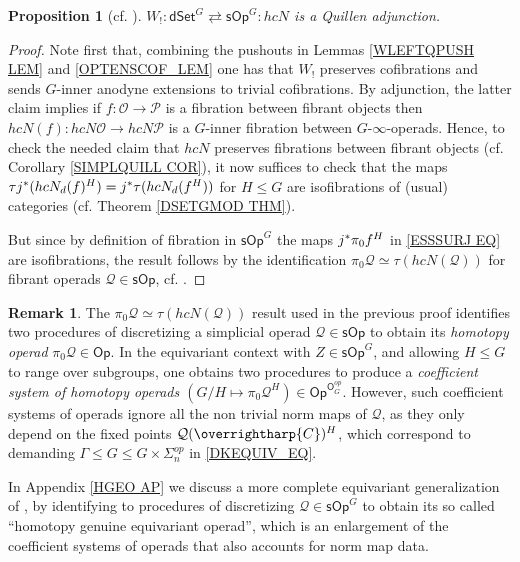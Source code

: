 \documentclass[a4paper,10pt
,draft
]{article}%
\numberwithin{equation}{section}
\numberwithin{figure}{section}
\newtheorem{proposition}[equation]{Proposition}%
\theoremstyle{definition} %
\newtheorem{remark}[equation]{Remark}%
\newcommand{\vect}[1]{\text{\overrightharp{\ensuremath{#1}}}}
\newcommand{\sOp}{\ensuremath{\mathsf{sOp}}}%
\newcommand{\dSet}{\mathsf{dSet}}
\newcommand{\1}{\ensuremath{\mathbbm 1}}%
\begin{document}
\begin{proposition}[{cf. \cite[Prop. 4.9]{CM11}}]
      \label{W!_LEFTQ_PROP}
      $W_!: \dSet^G \rightleftarrows \sOp^G\colon hcN$
      is a Quillen adjunction.
\end{proposition}

\begin{proof}
	Note first that, combining the pushouts in 
	Lemmas \ref{WLEFTQPUSH LEM}
	and \ref{OPTENSCOF_LEM}
	one has that 
	$W_!$ preserves cofibrations
	and sends $G$-inner anodyne extensions to trivial cofibrations.
	By adjunction,
	the latter claim implies 
	if $f\colon \mathcal{O} \to \mathcal{P}$ is a fibration between fibrant objects
	then 
	$hcN (f)\colon hcN \mathcal{O} \to hcN\mathcal{P}$
	is a $G$-inner fibration between $G$-$\infty$-operads.
	Hence, to check the needed claim that 
	$hcN$ preserves fibrations between fibrant objects
	(cf. Corollary \ref{SIMPLQUILL COR}),
	it now suffices to check that the maps
	$\tau j^{\**} (h c N_d(f)^H) = j^{\**} \tau (h c N_d(f^H))$
	for $H \leq G$
	are isofibrations of (usual) categories
	(cf. Theorem \ref{DSETGMOD THM}).
	
	But since by definition 
	of fibration in $\mathsf{sOp}^G$
	the maps $j^{\**} \pi_0 f^H$ in \eqref{ESSSURJ EQ}
	are isofibrations,
	the result follows by the identification
	$\pi_0 \mathcal{Q} \simeq 
	\tau \left(h c N (\mathcal{Q}) \right)$ for fibrant operads $\mathcal{Q} \in \mathsf{sOp}$,
	cf. \cite[Prop. 4.8]{CM13b}.
\end{proof}




\begin{remark}
	The $\pi_0 \mathcal{Q} \simeq 
	\tau \left(h c N (\mathcal{Q}) \right)$ result \cite[Prop. 4.9]{CM13b}
	used in the previous proof
	identifies two procedures of discretizing 
	a simplicial operad $\mathcal{Q} \in \mathsf{sOp}$
	to obtain its \emph{homotopy operad}
	$\pi_0 \mathcal{Q} \in \mathsf{Op}$.
	In the equivariant context with 
	$Z \in \mathsf{sOp}^G$,
	and allowing $H\leq G$ to range over subgroups,
	one obtains two procedures to produce a 
	\emph{coefficient system of homotopy operads
	$(G/H \mapsto \pi_0 \mathcal{Q}^H) \in \mathsf{Op}^{\mathsf{O}_G^{op}}$}.
	However, such coefficient systems of operads ignore
	all the non trivial norm maps
	of $\mathcal{Q}$,
	as they only depend on the fixed points
	$\mathcal{Q}(\vect{C})^{H}$,
	which correspond to demanding
	$\Gamma \leq G \leq G \times \Sigma_n^{op}$
	in \eqref{DKEQUIV_EQ}.
	
	In Appendix \ref{HGEO AP} we discuss a more complete equivariant generalization of \cite[Prop. 4.9]{CM13b},
	by identifying to procedures of discretizing 
	$\mathcal{Q} \in \mathsf{sOp}^G$
	to obtain its so called 
	``homotopy genuine equivariant operad'',
	which is an enlargement of the coefficient systems of operads that also accounts for norm map data.
\end{remark}
\end{document}
